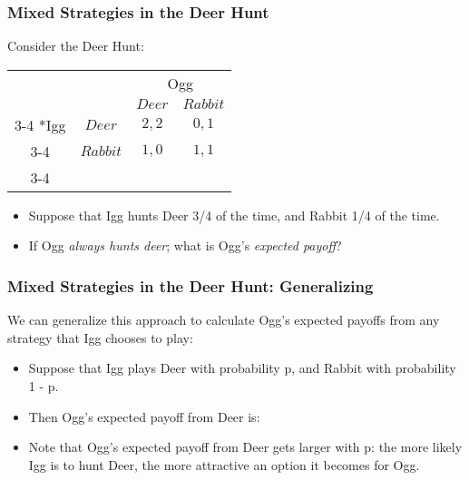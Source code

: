 
\begin{frame}
\frametitle{Mixed Strategies in the Deer Hunt}

Consider the Deer Hunt:

\begin{table}[h]
\centering
\begin{tabular}{cc|c|c|}
	& \multicolumn{1}{c}{} & \multicolumn{2}{c}{Ogg}\\
	& \multicolumn{1}{c}{} & \multicolumn{1}{c}{$Deer$}  & \multicolumn{1}{c}{$Rabbit$} \\\cline{3-4}
	\multirow{2}*{Igg}  & $Deer$ & $2, 2$ & $0, 1$ \\\cline{3-4}
	& $Rabbit$ & $1, 0$ & $1, 1$ \\\cline{3-4}
\end{tabular}
\end{table}

\begin{itemize}
	\item Suppose that Igg hunts Deer 3/4 of the time, and Rabbit 1/4 of the time.

  \item If Ogg \textit{always hunts deer}; 
  what is Ogg's \textit{expected payoff}?

  \vspace{5mm}

\end{itemize}
\end{frame}


\begin{frame}
\frametitle{Mixed Strategies in the Deer Hunt: Generalizing}

We can generalize this approach to calculate Ogg's expected payoffs from any strategy that Igg chooses to play:

\begin{itemize}

	\item Suppose that Igg plays Deer with probability p, and Rabbit with probability 1 - p.

	\item Then Ogg's expected payoff from Deer is:
  \vspace{20mm}

	\item Note that Ogg's expected payoff from Deer gets larger with p: the more likely Igg is to hunt Deer, the more attractive an option it becomes for Ogg.

\end{itemize}
\end{frame}

